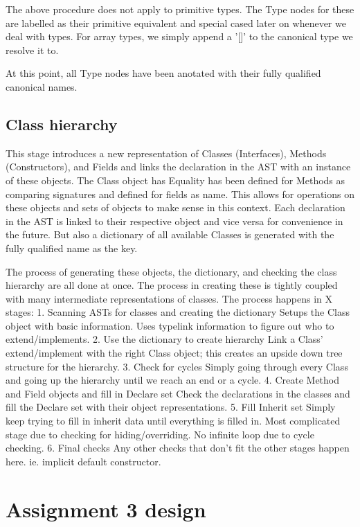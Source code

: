 \documentclass[12pt]{article}
\begin{document}
The above procedure does not apply to primitive types.  The Type nodes for these
are labelled as their primitive equivalent and special cased later on whenever we
deal with types.  For array types, we simply append a '[]' to the canonical type
we resolve it to.

At this point, all Type nodes have been anotated with their fully qualified
canonical names.

\subsection{Class hierarchy}
This stage introduces a new representation of Classes (Interfaces),
Methods (Constructors), and Fields and links the declaration in the AST
with an instance of these objects. The Class object has 
Equality has been defined for Methods as
comparing signatures and defined for fields as name. This allows for operations
on these objects and sets of objects to make sense in this context.
Each declaration in the AST is linked to their respective object and vice versa
for convenience in the future. But also a dictionary of all available Classes
is generated with the fully qualified name as the key.

The process of generating these objects, the dictionary, and checking the
class hierarchy are all done at once. The process in creating these is tightly
coupled with many intermediate representations of classes.
The process happens in X stages:
1. Scanning ASTs for classes and creating the dictionary
    Setups the Class object with basic information.
    Uses typelink information to figure out who to extend/implements.
2. Use the dictionary to create hierarchy
    Link a Class' extend/implement with the right Class object; this creates
    an upside down tree structure for the hierarchy.
3. Check for cycles
    Simply going through every Class and going up the hierarchy
    until we reach an end or a cycle.
4. Create Method and Field objects and fill in Declare set
    Check the declarations in the classes and fill the Declare set
    with their object representations.
5. Fill Inherit set
    Simply keep trying to fill in inherit data until everything is filled in.
    Most complicated stage due to checking for hiding/overriding.
    No infinite loop due to cycle checking.
6. Final checks
    Any other checks that don't fit the other stages happen here.
    ie. implicit default constructor.

\section{Assignment 3 design}
\end{document}
